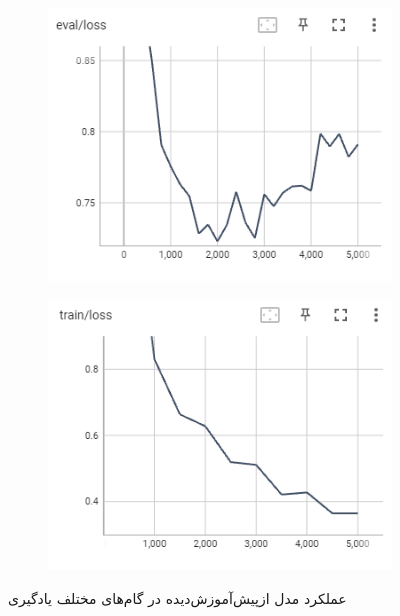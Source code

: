 \documentclass[12pt, a4paper]{book}
\begin{document}
\begin{figure}[h]
    \centering
    \begin{subfigure}{0.45\linewidth}
        \centering
        \includegraphics[width=\linewidth]{image/part1/tb/3.png}
    \end{subfigure}
    \hfil
    \begin{subfigure}{0.45\linewidth}
        \centering
        \includegraphics[width=\linewidth]{image/part1/tb/6.png}
    \end{subfigure}
    \caption{عملکرد مدل ازپیش‌آموزش‌دیده  در گام‌های مختلف یادگیری}
    \label{part1_training}
\end{figure}
\end{document}
